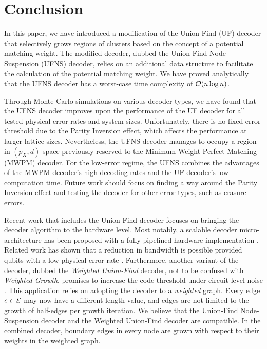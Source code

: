 \section{Conclusion}\label{sec:conclusion}

In this paper, we have introduced a modification of the Union-Find (UF) decoder \cite{delfosse2017almost} that selectively grows regions of clusters based on the concept of a potential matching weight. The modified decoder, dubbed the Union-Find Node-Suspension (UFNS) decoder, relies on an additional data structure to facilitate the calculation of the potential matching weight. We have proved analytically that the UFNS decoder has a worst-case time complexity of $\mathcal{O}(n\log{n})$. 

Through Monte Carlo simulations on various decoder types, we have found that the UFNS decoder improves upon the performance of the UF decoder for all tested physical error rates and system sizes. Unfortunately, there is no fixed error threshold due to the Parity Inversion effect, which affects the performance at larger lattice sizes. Nevertheless, the UFNS decoder manages to occupy a region in $(p_X, d)$ space previously reserved to the Minimum Weight Perfect Matching (MWPM) decoder. For the low-error regime, the UFNS combines the advantages of the MWPM decoder's high decoding rates and the UF decoder's low computation time. Future work should focus on finding a way around the Parity Inversion effect and testing the decoder for other error types, such as erasure errors. 

Recent work that includes the Union-Find decoder focuses on bringing the decoder algorithm to the hardware level. Most notably, a scalable decoder micro-architecture has been proposed with a fully pipelined hardware implementation \cite{das2020scalable}. Related work has shown that a reduction in bandwidth is possible provided qubits with a low physical error rate \cite{delfosse2020hierarchical}. Furthermore, another variant of the decoder, dubbed the \emph{Weighted Union-Find} decoder, not to be confused with \emph{Weighted Growth}, promises to increase the code threshold under circuit-level noise \cite{huang2020fault}. This application relies on adopting the decoder to a \emph{weighted} graph. Every edge $e\in\mathcal{E}$ may now have a different length value, and edges are not limited to the growth of half-edges per growth iteration. We believe that the Union-Find Node-Suspension decoder and the Weighted Union-Find decoder are compatible. In the combined decoder, boundary edges in every node are grown with respect to their weights in the weighted graph. 

